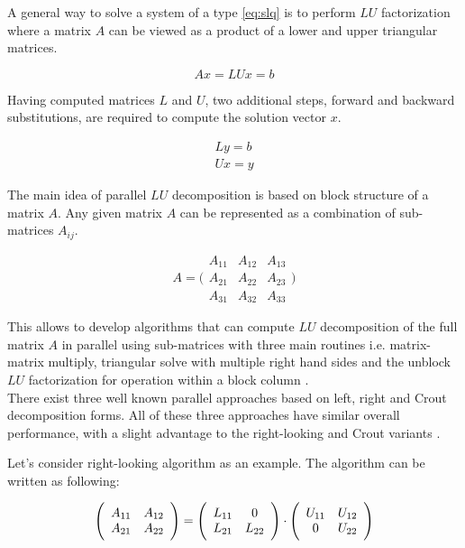 A general way to solve a system of a type \ref{eq:slq} is to perform $LU$ factorization where a matrix $A$ can be viewed as a product of a lower and upper triangular matrices. 

\begin{equation} \label{eq:lu}
	Ax = LUx = b
\end{equation}

Having computed matrices $L$ and $U$, two additional steps, forward and backward substitutions, are required to compute the solution vector $x$.

\begin{align} \label{eq:bk}
	Ly = b \\
	Ux = y
\end{align}

The main idea of parallel $LU$ decomposition is based on block structure of a matrix $A$. Any given matrix $A$ can be represented as a combination of sub-matrices $A_{ij}$.

$$
A = 
\Bigg(\begin{array}{c|c|c}
A_{11} & A_{12} & A_{13} \\ \hline
A_{21} & A_{22} & A_{23} \\ \hline
A_{31} & A_{32} & A_{33}
\end{array}\Bigg)
$$

This allows to develop algorithms that can compute $LU$ decomposition of the full matrix $A$ in parallel using sub-matrices with three main routines i.e. matrix-matrix multiply, triangular solve with multiple right hand sides and the unblock $LU$ factorization for operation within a block column \cite{netlib:lapack-1}.\\

There exist three well known parallel approaches based on left, right and Crout decomposition forms. All of these three approaches have similar overall performance, with a slight advantage to the right-looking and Crout variants \cite{netlib:lapack-1}. 


Let's consider right-looking algorithm as an example. The algorithm can be written as following:

\begin{equation} \label{eq:RightLookingLu}
\Bigg(\begin{array}{c c}
A_{11} & A_{12} \\
A_{21} & A_{22} \\
\end{array}\Bigg)
=
\Bigg(\begin{array}{c c}
L_{11} & 0 \\
L_{21} & L_{22} \\
\end{array}\Bigg)
\cdot
\Bigg(\begin{array}{c c}
U_{11} & U_{12} \\
0 & U_{22} \\
\end{array}\Bigg)
\end{equation}

